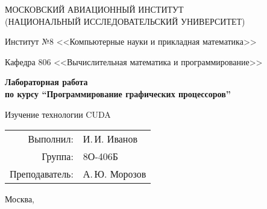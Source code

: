 \begin{titlepage}
\begin{center}
\large
МОСКОВСКИЙ АВИАЦИОННЫЙ ИНСТИТУТ\\ (НАЦИОНАЛЬНЫЙ ИССЛЕДОВАТЕЛЬСКИЙ УНИВЕРСИТЕТ)

\vspace{20pt}

Институт №8 <<Компьютерные науки и прикладная математика>>

Кафедра 806 <<Вычислительная математика и программирование>>
\end{center}

\vspace{60pt}

\begin{center}
\bfseries
\large
Лабораторная работа  \\по курсу \enquote{Программирование графических процессоров}

\vspace{54pt}

Изучение технологии CUDA
\end{center}

\vspace{175pt}

\begin{flushright}
\large
\begin{tabular}{rl}
Выполнил: & И.\,И. Иванов \\
Группа: & 8О-406Б \\
Преподаватель: & А.\,Ю. Морозов \\
\end{tabular}
\end{flushright}

\vfill

\begin{center}
\large
Москва, \the\year
\end{center}
\end{titlepage}

\pagebreak
